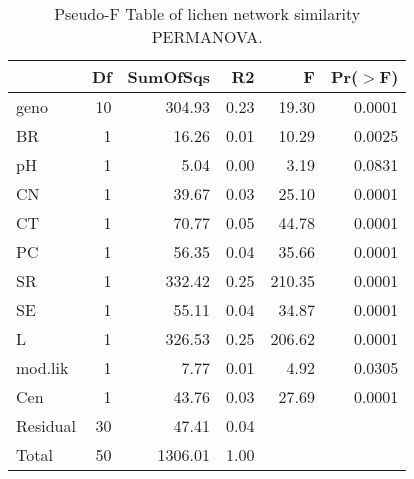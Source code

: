 \begin{table}[ht]
\centering
\begin{tabular}{lrrrrr}
  \hline
 & Df & SumOfSqs & R2 & F & Pr($>$F) \\ 
  \hline
geno & 10 & 304.93 & 0.23 & 19.30 & 0.0001 \\ 
  BR & 1 & 16.26 & 0.01 & 10.29 & 0.0025 \\ 
  pH & 1 & 5.04 & 0.00 & 3.19 & 0.0831 \\ 
  CN & 1 & 39.67 & 0.03 & 25.10 & 0.0001 \\ 
  CT & 1 & 70.77 & 0.05 & 44.78 & 0.0001 \\ 
  PC & 1 & 56.35 & 0.04 & 35.66 & 0.0001 \\ 
  SR & 1 & 332.42 & 0.25 & 210.35 & 0.0001 \\ 
  SE & 1 & 55.11 & 0.04 & 34.87 & 0.0001 \\ 
  L & 1 & 326.53 & 0.25 & 206.62 & 0.0001 \\ 
  mod.lik & 1 & 7.77 & 0.01 & 4.92 & 0.0305 \\ 
  Cen & 1 & 43.76 & 0.03 & 27.69 & 0.0001 \\ 
  Residual & 30 & 47.41 & 0.04 &  &  \\ 
  Total & 50 & 1306.01 & 1.00 &  &  \\ 
   \hline
\end{tabular}
\caption{Pseudo-F Table of lichen network similarity PERMANOVA.} 
\label{tab:cn_perm}
\end{table}
